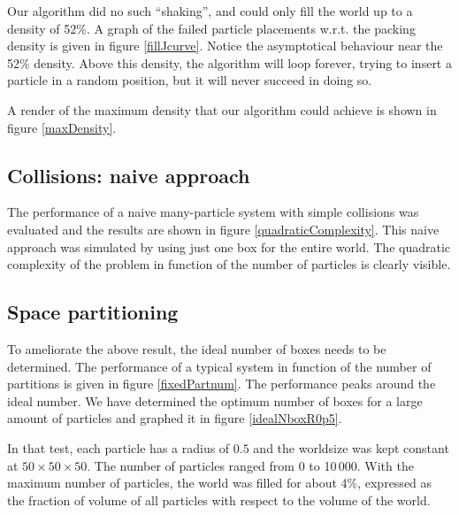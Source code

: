 Our algorithm did no such ``shaking'', and could only fill the world up to a 
density of 52\%. A graph of the failed particle placements w.r.t. the packing 
density is given in figure \ref{fillJcurve}. Notice the asymptotical behaviour 
near the 52\% density. Above this density, the algorithm will loop forever, 
trying to insert a particle in a random position, but it will never succeed in 
doing so.

A render of the maximum density that our algorithm could achieve is shown 
in figure \ref{maxDensity}.



\subsection{Collisions: naive approach}
The performance of a naive many-particle system with simple collisions was 
evaluated and the results are shown in figure \ref{quadraticComplexity}.  This 
naive approach was simulated by using just one box for the entire world. The 
quadratic complexity of the problem in function of the number of particles is 
clearly visible.




\subsection{Space partitioning}
To ameliorate the above result, the ideal number of boxes needs to be 
determined.  The performance of a typical system in function of the number of 
partitions is given in figure \ref{fixedPartnum}. The performance peaks around 
the ideal number.  We have determined the optimum number of boxes for a large 
amount of particles and graphed it in figure \ref{idealNboxR0p5}.



In that test, each particle has a radius of $0.5$ and the worldsize was 
kept constant at $50 \times 50 \times 50$. The number of particles ranged 
from 0 to 10\,000. With the maximum number of particles, the world was 
filled for about 4\%, expressed as the fraction of volume of all particles 
with respect to the volume of the world.

